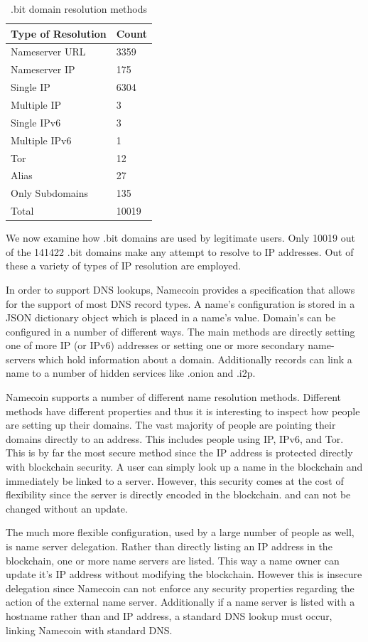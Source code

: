 \begin{table}[t]
\begin{tabular}{ll}
Type of Resolution & Count \\ \hline
Nameserver URL     & 3359  \\
Nameserver IP      & 175   \\
Single IP          & 6304  \\
Multiple IP        & 3     \\
Single IPv6        & 3     \\
Multiple IPv6      & 1     \\
Tor                & 12    \\
Alias              & 27    \\
Only Subdomains    & 135   \\ \hline
Total              & 10019
\end{tabular}
\caption{.bit domain resolution methods}
\end{table}

We now examine how .bit domains are used by legitimate users. Only 10019 out of the 141422 .bit domains make any attempt to resolve to IP addresses. Out of these a variety of types of IP resolution are employed.

In order to support DNS lookups, Namecoin provides a specification that allows for the support of most DNS record types. A name's configuration is stored in a JSON dictionary object which is placed in a name's value. Domain's can be configured in a number of different ways. The main methods are directly setting one of more IP (or IPv6) addresses or setting one or more secondary name-servers which hold information about a domain. Additionally records can link a name to a number of hidden services like .onion\cite{onion} and .i2p\cite{i2p}.

Namecoin supports a number of different name resolution methods. Different methods have different properties and thus it is interesting to inspect how people are setting up their domains. The vast majority of people are pointing their domains directly to an address. This includes people using IP, IPv6, and Tor. This is by far the most secure method since the IP address is protected directly with blockchain security. A user can simply look up a name in the blockchain and immediately be linked to a server. However, this security comes at the cost of flexibility since the server is directly encoded in the blockchain. and can not be changed without an update.


The much more flexible configuration, used by a large number of people as well, is name server delegation. Rather than directly listing an IP address in the blockchain, one or more name servers are listed. This way a name owner can update it's IP address without modifying the blockchain. However this is insecure delegation since Namecoin can not enforce any security properties regarding the action of the external name server. Additionally if a name server is listed with a hostname rather than and IP address, a standard DNS lookup must occur, linking Namecoin with standard DNS.

